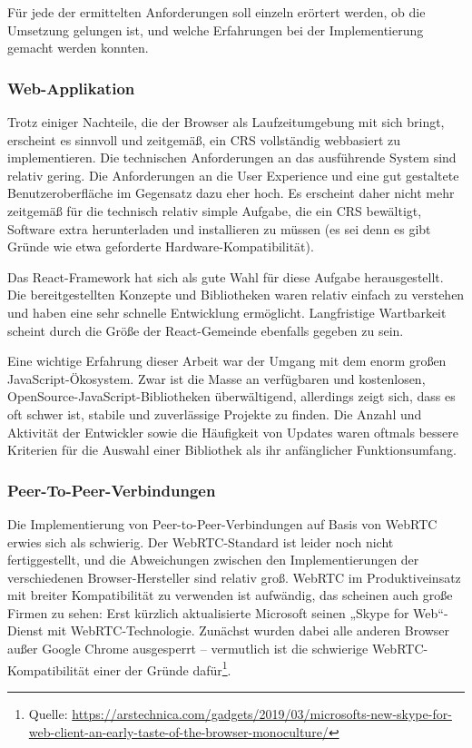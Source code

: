 Für jede der ermittelten Anforderungen soll einzeln erörtert werden, ob die Umsetzung gelungen ist, und welche Erfahrungen bei der Implementierung gemacht werden konnten.

\subsubsection*{Web-Applikation}
Trotz einiger Nachteile, die der Browser als Laufzeitumgebung mit sich bringt, erscheint es sinnvoll und zeitgemäß, ein CRS vollständig webbasiert zu implementieren. Die technischen Anforderungen an das ausführende System sind relativ gering. Die Anforderungen an die User Experience und eine gut gestaltete Benutzeroberfläche im Gegensatz dazu eher hoch. Es erscheint daher nicht mehr zeitgemäß für die technisch relativ simple Aufgabe, die ein CRS bewältigt, Software extra herunterladen und installieren zu müssen (es sei denn es gibt Gründe wie etwa geforderte Hardware-Kompatibilität).

Das React-Framework hat sich als gute Wahl für diese Aufgabe herausgestellt. Die bereitgestellten Konzepte und Bibliotheken waren relativ einfach zu verstehen und haben eine sehr schnelle Entwicklung ermöglicht. Langfristige Wartbarkeit scheint durch die Größe der React-Gemeinde ebenfalls gegeben zu sein.

Eine wichtige Erfahrung dieser Arbeit war der Umgang mit dem enorm großen JavaScript-Ökosystem. Zwar ist die Masse an verfügbaren und kostenlosen, OpenSource-JavaScript-Bibliotheken überwältigend, allerdings zeigt sich, dass es oft schwer ist, stabile und zuverlässige Projekte zu finden. Die Anzahl und Aktivität der Entwickler sowie die Häufigkeit von Updates waren oftmals bessere Kriterien für die Auswahl einer Bibliothek als ihr anfänglicher Funktionsumfang.

\subsubsection*{Peer-To-Peer-Verbindungen}
Die Implementierung von Peer-to-Peer-Verbindungen auf Basis von WebRTC erwies sich als schwierig. Der WebRTC-Standard ist leider noch nicht fertiggestellt, und die Abweichungen zwischen den Implementierungen der verschiedenen Browser-Hersteller sind relativ groß. WebRTC im Produktiveinsatz mit breiter Kompatibilität zu verwenden ist aufwändig, das scheinen auch große Firmen zu sehen: Erst kürzlich aktualisierte Microsoft seinen „Skype for Web“-Dienst mit WebRTC-Technologie. Zunächst wurden dabei alle anderen Browser außer Google Chrome ausgesperrt – vermutlich ist die schwierige WebRTC-Kompatibilität einer der Gründe dafür\footnote{Quelle: \url{https://arstechnica.com/gadgets/2019/03/microsofts-new-skype-for-web-client-an-early-taste-of-the-browser-monoculture/}}.

